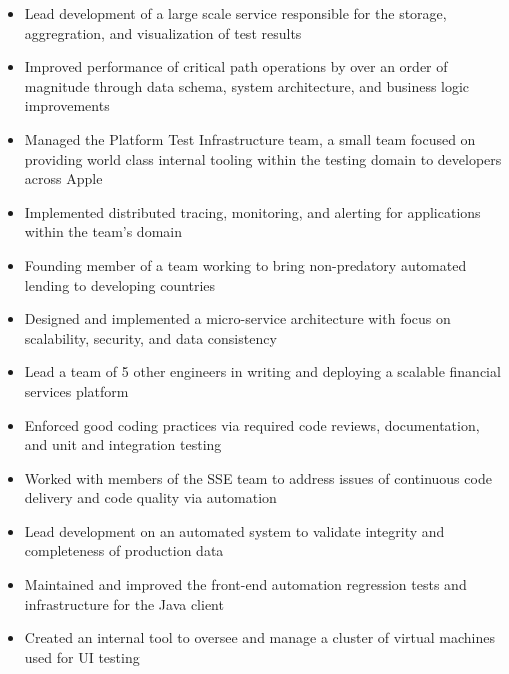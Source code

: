 \documentclass[11pt,letterpaper,sans]{moderncv}        %
\begin{document}
\begin{itemize}
\item Lead development of a large scale service responsible for the storage, aggregration, and visualization of test results
\item Improved performance of critical path operations by over an order of magnitude through data schema, system architecture, and business logic improvements
\item Managed the Platform Test Infrastructure team, a small team focused on providing world class internal tooling within the testing domain to developers across Apple
\item Implemented distributed tracing, monitoring, and alerting for applications within the team's domain
\end{itemize}

\begin{itemize}
\item Founding member of a team working to bring non-predatory automated lending to developing countries
\item Designed and implemented a micro-service architecture with focus on scalability, security, and data consistency
\item Lead a team of 5 other engineers in writing and deploying a scalable financial services platform
\item Enforced good coding practices via required code reviews, documentation, and unit and integration testing
\end{itemize}

\begin{itemize}
\item Worked with members of the SSE team to address issues of continuous code delivery and code quality via automation
\item Lead development on an automated system to validate integrity and completeness of production data
\item Maintained and improved the front-end automation regression tests and infrastructure for the Java client
\item Created an internal tool to oversee and manage a cluster of virtual machines used for UI testing
\end{itemize}
\end{document}
